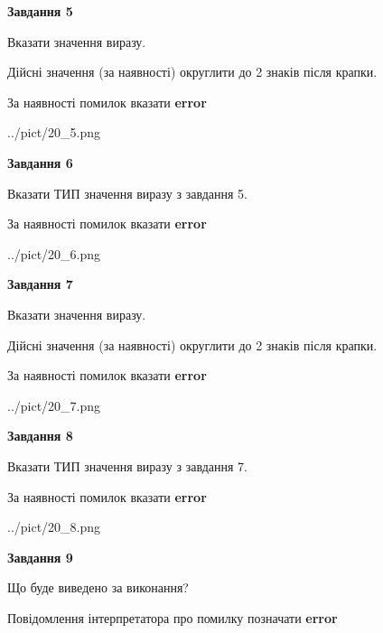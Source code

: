 \documentclass[11pt, ukrainian]{article}
\begin{document}
{\begin {large}
{\begin {center}\textbf{Завдання 5}\end {center}}\par
Вказати значення виразу. \par
Дійсні значення (за наявності) округлити до 2 знаків після крапки. \par
За наявності помилок вказати \textbf{error}

\begin{center}
	{../pict/20_5.png}
\end{center}
\newpage

{\begin {center}\textbf{Завдання 6}\end {center}}\par
Вказати ТИП значення виразу з завдання 5. \par
За наявності помилок вказати \textbf{error}

\begin{center}
	{../pict/20_6.png}
\end{center}
\newpage

{\begin {center}\textbf{Завдання 7}\end {center}}\par
Вказати значення виразу. \par
Дійсні значення (за наявності) округлити до 2 знаків після крапки. \par
За наявності помилок вказати \textbf{error}

\begin{center}
	{../pict/20_7.png}
\end{center}
\newpage

{\begin {center}\textbf{Завдання 8}\end {center}}\par
Вказати ТИП значення виразу з завдання 7. \par
За наявності помилок вказати \textbf{error}

\begin{center}
	{../pict/20_8.png}
\end{center}
\newpage

{\begin {center}\textbf{Завдання 9}\end {center}}\par
Що буде виведено за виконання? \par
Повідомлення інтерпретатора про помилку позначати \textbf{error}


\end{large}}
\end{document}

